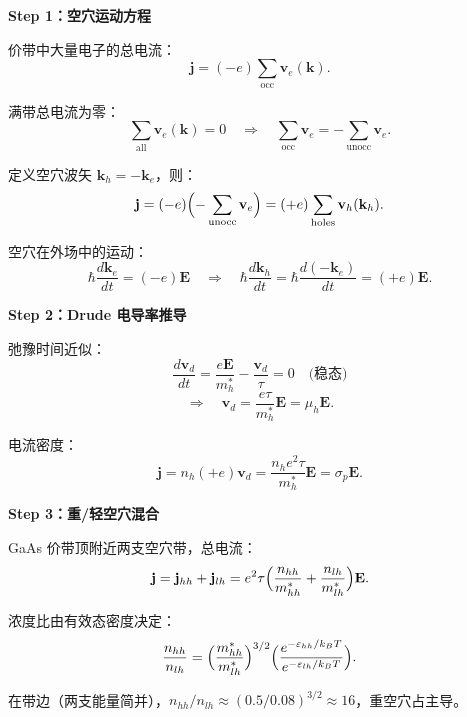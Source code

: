 \begin{derivationbox}
\textbf{Step 1：空穴运动方程}

价带中大量电子的总电流：
\[
\mathbf{j}=(-e)\sum_{\text{occ}}\mathbf{v}_e(\mathbf{k}).
\]

满带总电流为零：
\[
\sum_{\text{all}}\mathbf{v}_e(\mathbf{k})=0\quad\Rightarrow\quad
\sum_{\text{occ}}\mathbf{v}_e=-\sum_{\text{unocc}}\mathbf{v}_e.
\]

定义空穴波矢 $\mathbf{k}_h=-\mathbf{k}_e$，则：
\[
\mathbf{j}=(-e)\Bigl(-\sum_{\text{unocc}}\mathbf{v}_e\Bigr)=(+e)\sum_{\text{holes}}\mathbf{v}_h(\mathbf{k}_h).
\]

空穴在外场中的运动：
\[
\hbar\frac{d\mathbf{k}_e}{dt}=(-e)\mathbf{E}\quad\Rightarrow\quad
\hbar\frac{d\mathbf{k}_h}{dt}=\hbar\frac{d(-\mathbf{k}_e)}{dt}=(+e)\mathbf{E}.
\]

\textbf{Step 2：Drude 电导率推导}

弛豫时间近似：
\[
\frac{d\mathbf{v}_d}{dt}=\frac{e\mathbf{E}}{m_h^*}-\frac{\mathbf{v}_d}{\tau}=0\quad\text{(稳态)}
\]
\[
\Rightarrow\quad\mathbf{v}_d=\frac{e\tau}{m_h^*}\mathbf{E}=\mu_h\mathbf{E}.
\]

电流密度：
\[
\mathbf{j}=n_h(+e)\mathbf{v}_d=\frac{n_h e^2\tau}{m_h^*}\mathbf{E}=\sigma_p\mathbf{E}.
\]

\textbf{Step 3：重/轻空穴混合}

GaAs 价带顶附近两支空穴带，总电流：
\[
\mathbf{j}=\mathbf{j}_{hh}+\mathbf{j}_{lh}=e^2\tau\Bigl(\frac{n_{hh}}{m_{hh}^*}+\frac{n_{lh}}{m_{lh}^*}\Bigr)\mathbf{E}.
\]

浓度比由有效态密度决定：
\[
\frac{n_{hh}}{n_{lh}}=\Bigl(\frac{m_{hh}^*}{m_{lh}^*}\Bigr)^{3/2}\Bigl(\frac{e^{-\varepsilon_{hh}/k_BT}}{e^{-\varepsilon_{lh}/k_BT}}\Bigr).
\]

在带边（两支能量简并），$n_{hh}/n_{lh}\approx(0.5/0.08)^{3/2}\approx16$，重空穴占主导。
\end{derivationbox}

\vspace{1em}
